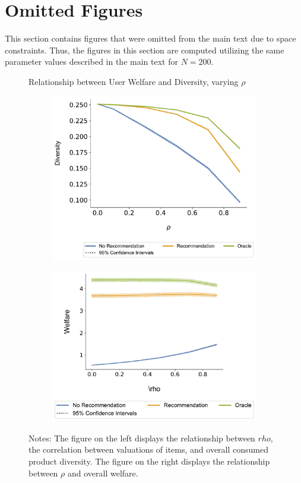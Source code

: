 \documentclass[format=acmsmall, review=true]{acmart}
\title[\PaperTitle]{\PaperTitle}
\begin{document}
\maketitle

\section{Omitted Figures}

This section contains figures that were omitted from the main text due to space constraints. Thus, the figures in this section are computed utilizing the same parameter values described in the main text for $N = 200$.

\begin{figure}[ht]
\caption{Relationship between User Welfare and Diversity, varying $\rho$}\label{fig:diversity_welfare_correlation}
\begin{subfigure}{.45\linewidth}
  \includegraphics[width=.8\linewidth]{figures/rho_diversity_N_200_T_20.pdf}
\end{subfigure}
\ContinuedFloat
\begin{subfigure}{.45\linewidth}
  \includegraphics[width=.8\linewidth]{figures/rho_welfare_N_200_T_20.pdf}
\end{subfigure}
\caption*{\scriptsize Notes: The figure on the left displays the relationship between $rho$, the correlation between valuations of items, and overall consumed product diversity. The figure on the right displays the relationship between $\rho$ and overall welfare.}
\end{figure}
\end{document}
